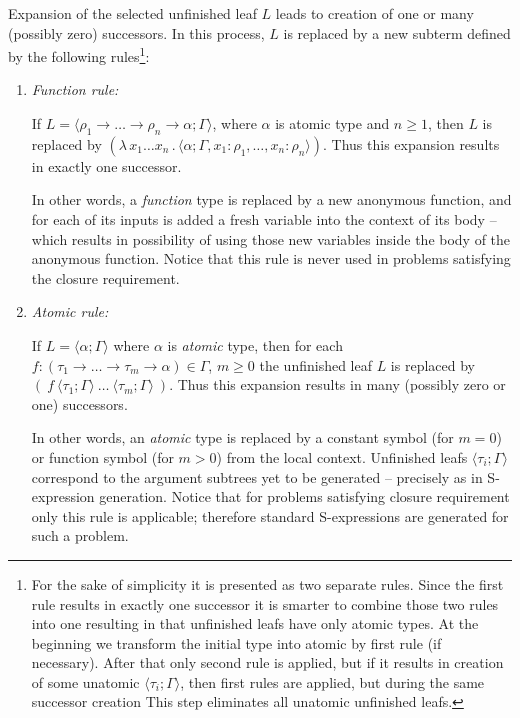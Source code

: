 \documentclass[conference]{IEEEtran}
\newcommand{\lamb}[2]{( \lambda \, #1 \, . \, #2 )}
\newcommand{\ar}{\rightarrow\xspace}
\newcommand{\ul}[2]{\langle #1 ; #2 \rangle}
\begin{document}
Expansion of the selected unfinished leaf $L$ leads to creation of 
one or many (possibly zero) successors.
In this process, $L$ is replaced
by a new subterm defined by the following rules\footnote{
For the sake of simplicity it is presented as two separate rules. 
Since the first rule results in exactly one successor it is smarter
to combine those two rules into one resulting in that unfinished leafs
have only atomic types. At the beginning we transform the initial type into atomic by first rule (if necessary). After that
only second rule is applied, but if it results in creation of some unatomic 
$\ul{\tau_i}{\Gamma}$, then first rules are applied, but during the same successor creation This step eliminates all unatomic unfinished leafs. }:
\begin{enumerate}
 \item \textit{Function rule:} 
 
 If $L = \ul{\rho_1 \ar \dots \ar \rho_n \ar \alpha}{\Gamma}$,
 	   where $\alpha$ is atomic type and $n \geq 1$, 
       then $L$ is replaced by 
       $\lamb{x_1 \dots x_n}{\ul{\alpha}
       {\Gamma,x_1 \colon \rho_1,\dots,x_n \colon \rho_n}}$.
       Thus this expansion results in exactly one successor.
       
       In other words, a \textit{function} type is replaced by a new anonymous function, and for each of its inputs is added a fresh variable into the context of its body -- which results in possibility of using those new variables inside the body of the anonymous function. Notice that this rule is never used in problems satisfying the closure requirement.
 \item \textit{Atomic rule:} 
 
 If $L = \ul{\alpha}{\Gamma}$ where $\alpha$ is \textit{atomic} type, then for each 
       \mbox{$f : (\tau_1 \ar \dots \ar \tau_m \ar \alpha) \in \Gamma$}, $m \geq 0$
       the unfinished leaf $L$ is replaced by 
       $(~f~\ul{\tau_1}{\Gamma}~\dots~\ul{\tau_m}{\Gamma}~)$.
       Thus this expansion results in many (possibly zero or one) successors.
       
       In other words, an \textit{atomic} type is replaced by a constant symbol (for $m = 0$) or function symbol (for $m>0$) from the local context. Unfinished leafs $\ul{\tau_i}{\Gamma}$ correspond to the argument subtrees yet to be generated -- precisely as in S-expression generation. Notice that for problems satisfying closure requirement only this rule is applicable; therefore standard S-expressions are generated for such a problem.   
\end{enumerate}
\end{document}
